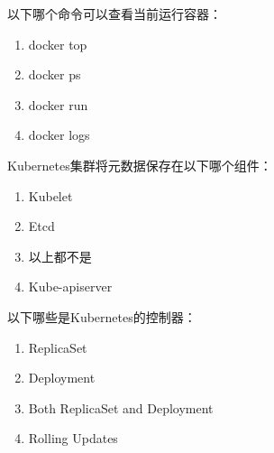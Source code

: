 \begin{problem}
	以下哪个命令可以查看当前运行容器：
    \vspace{-0.8em}
    \begin{multicols}{4}
        \begin{enumerate}[label=\Alph*.]
            \item docker top
            \item docker ps
            \item docker run
            \item docker logs
        \end{enumerate}
    \end{multicols}
    \vspace{-1em}
\end{problem}



\begin{problem}
	Kubernetes集群将元数据保存在以下哪个组件：
    \vspace{-0.8em}
    \begin{multicols}{4}
        \begin{enumerate}[label=\Alph*.]
            \item Kubelet
            \item Etcd
            \item 以上都不是
            \item Kube-apiserver
        \end{enumerate}
    \end{multicols}
    \vspace{-1em}
\end{problem}



\begin{problem}
	以下哪些是Kubernetes的控制器：
    \vspace{-0.8em}
    \begin{multicols}{2}
        \begin{enumerate}[label=\Alph*.]
            \item ReplicaSet
            \item Deployment
            \item Both ReplicaSet and Deployment
            \item Rolling Updates
        \end{enumerate}
    \end{multicols}
    \vspace{-1em}
\end{problem}



